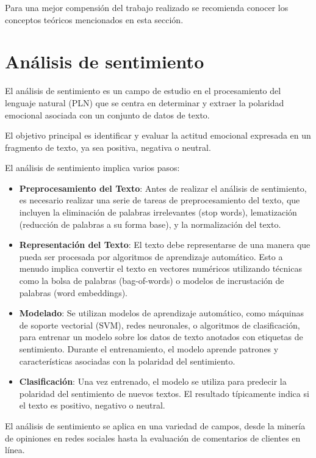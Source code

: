 
Para una mejor compensión del trabajo realizado se recomienda conocer los conceptos teóricos mencionados en esta sección.

\section{Análisis de sentimiento}
El análisis de sentimiento es un campo de estudio en el procesamiento del lenguaje natural (PLN) que se centra en determinar y extraer la polaridad emocional asociada con un conjunto de datos de texto. 

El objetivo principal es identificar y evaluar la actitud emocional expresada en un fragmento de texto, ya sea positiva, negativa o neutral.


El análisis de sentimiento implica varios pasos:
\begin{itemize}
	\item \textbf{Preprocesamiento del Texto}: Antes de realizar el análisis de sentimiento, es necesario realizar una serie de tareas de preprocesamiento del texto, que incluyen la eliminación de palabras irrelevantes (stop words), lematización (reducción de palabras a su forma base), y la normalización del texto.
	\item \textbf{Representación del Texto}: El texto debe representarse de una manera que pueda ser procesada por algoritmos de aprendizaje automático. Esto a menudo implica convertir el texto en vectores numéricos utilizando técnicas como la bolsa de palabras (bag-of-words) o modelos de incrustación de palabras (word embeddings).
	\item \textbf{Modelado}: Se utilizan modelos de aprendizaje automático, como máquinas de soporte vectorial (SVM), redes neuronales, o algoritmos de clasificación, para entrenar un modelo sobre los datos de texto anotados con etiquetas de sentimiento. Durante el entrenamiento, el modelo aprende patrones y características asociadas con la polaridad del sentimiento.
	\item \textbf{Clasificación}: Una vez entrenado, el modelo se utiliza para predecir la polaridad del sentimiento de nuevos textos. El resultado típicamente indica si el texto es positivo, negativo o neutral.
\end{itemize}

El análisis de sentimiento se aplica en una variedad de campos, 
desde la minería de opiniones en redes sociales hasta la 
evaluación de comentarios de clientes en línea. 

